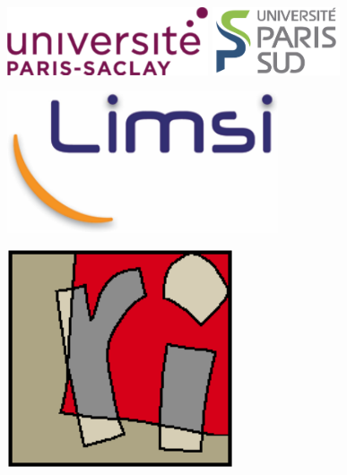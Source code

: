 \documentclass[oneside]{memoir}
\begin{document}
\begin{titlingpage}

\begin{center}

%
\includegraphics[height=2cm]{logos/upsay.pdf} \hfill %
\includegraphics[height=2cm]{logos/ups.png} %
\\[1.5cm]


\begin{minipage}{0.2\textwidth}
  \begin{flushright}
    \includegraphics[width=0.6\textwidth]{logos/limsi.png}
  \end{flushright}
\end{minipage}
\begin{minipage}{0.2\textwidth}
  \begin{flushright}
    \includegraphics[width=0.5\textwidth]{logos/lri.png}
  \end{flushright}
\end{minipage}



\end{center}
\end{titlingpage}
\end{document}
